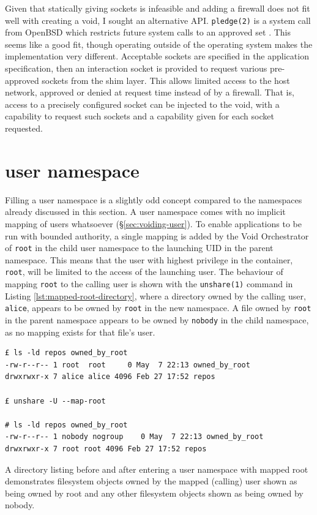 \documentclass[12pt,a4paper,twoside]{report}
\begin{document}
Given that statically giving sockets is infeasible and adding a firewall does not fit well with creating a void, I sought an alternative API. \texttt{pledge(2)} is a system call from OpenBSD which restricts future system calls to an approved set \citep{the_openbsd_foundation_pledge2_2022}. This seems like a good fit, though operating outside of the operating system makes the implementation very different. Acceptable sockets are specified in the application specification, then an interaction socket is provided to request various pre-approved sockets from the shim layer. This allows limited access to the host network, approved or denied at request time instead of by a firewall. That is, access to a precisely configured socket can be injected to the void, with a capability to request such sockets and a capability given for each socket requested.

\section{user namespace}
\label{sec:filling-user}

Filling a user namespace is a slightly odd concept compared to the namespaces already discussed in this section. A user namespace comes with no implicit mapping of users whatsoever (§\ref{sec:voiding-user}). To enable applications to be run with bounded authority, a single mapping is added by the Void Orchestrator of \texttt{root} in the child user namespace to the launching UID in the parent namespace. This means that the user with highest privilege in the container, \texttt{root}, will be limited to the access of the launching user. The behaviour of mapping \texttt{root} to the calling user is shown with the \texttt{unshare(1)} command in Listing \ref{lst:mapped-root-directory}, where a directory owned by the calling user, \texttt{alice}, appears to be owned by \texttt{root} in the new namespace. A file owned by \texttt{root} in the parent namespace appears to be owned by \texttt{nobody} in the child namespace, as no mapping exists for that file's user.

\begin{listing}
\begin{verbatim}
£ ls -ld repos owned_by_root
-rw-r--r-- 1 root  root     0 May  7 22:13 owned_by_root
drwxrwxr-x 7 alice alice 4096 Feb 27 17:52 repos

£ unshare -U --map-root

# ls -ld repos owned_by_root
-rw-r--r-- 1 nobody nogroup    0 May  7 22:13 owned_by_root
drwxrwxr-x 7 root root 4096 Feb 27 17:52 repos
\end{verbatim}

\caption{A directory listing before and after entering a user namespace with mapped root demonstrates filesystem objects owned by the mapped (calling) user shown as being owned by root and any other filesystem objects shown as being owned by nobody.}
\label{lst:mapped-root-directory}
\end{listing}
\end{document}

